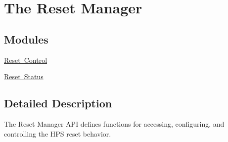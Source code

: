 \hypertarget{group__RST__MGR}{}\section{The Reset Manager}
\label{group__RST__MGR}
\subsection*{Modules}
\begin{DoxyCompactItemize}
\item 
\mbox{\hyperlink{group__RST__MGR__CTRL}{Reset Control}}
\item 
\mbox{\hyperlink{group__RST__MGR__STATUS}{Reset Status}}
\end{DoxyCompactItemize}


\subsection{Detailed Description}
The Reset Manager A\+PI defines functions for accessing, configuring, and controlling the H\+PS reset behavior. 